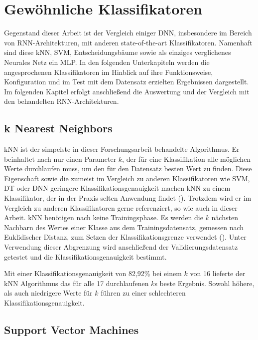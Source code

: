 \chapter{Gewöhnliche Klassifikatoren}
\label{chap:other-classifiers}

Gegenstand dieser Arbeit ist der Vergleich einiger DNN, insbesondere im Bereich von RNN-Architekturen, mit anderen state-of-the-art Klassifikatoren. Namenhaft sind diese kNN, SVM, Entscheidungsbäume sowie als einziges verglichenes Neurales Netz ein MLP. In den folgenden Unterkapiteln werden die angesprochenen Klassifikatoren im Hinblick auf ihre Funktionsweise, Konfiguration und im Test mit dem Datensatz erzielten Ergebnissen dargestellt. Im folgenden Kapitel erfolgt anschließend die Auswertung und der Vergleich mit den behandelten RNN-Architekturen.


\section{k Nearest Neighbors}
\label{sec:knn}

kNN ist der simpelste in dieser Forschungsarbeit behandelte Algorithmus. Er beinhaltet nach \cite{Kaufmann2013} nur einen Parameter $k$, der für eine Klassifikation alle möglichen Werte durchlaufen muss, um den für den Datensatz besten Wert zu finden. Diese Eigenschaft sowie die zumeist im Vergleich zu anderen Klassifikatoren wie SVM, DT oder DNN geringere Klassifikationsgenauigkeit machen kNN zu einem Klassifikator, der in der Praxis selten Anwendung findet (\cite{Kaufmann2013}). Trotzdem wird er im Vergleich zu anderen Klassifikatoren gerne referenziert, so wie auch in dieser Arbeit. kNN benötigen nach \cite{Kaufmann2013} keine Trainingsphase. Es werden die $k$ nächsten Nachbarn des Wertes einer Klasse aus dem Trainingsdatensatz, gemessen nach Euklidischer Distanz, zum Setzen der Klassifikationsgrenze verwendet (\cite{Kaufmann2013}). Unter Verwendung dieser Abgrenzung wird anschließend der Validierungsdatensatz getestet und die Klassifikationsgenauigkeit bestimmt.

Mit einer Klassifikationsgenauigkeit von 82,92\% bei einem $k$ von 16 lieferte der kNN Algorithmus das für alle 17 durchlaufenen $k$s beste Ergebnis. Sowohl höhere, als auch niedrigere Werte für $k$ führen zu einer schlechteren Klassifikationsgenauigkeit.

\section{Support Vector Machines}
\label{sec:svm}

